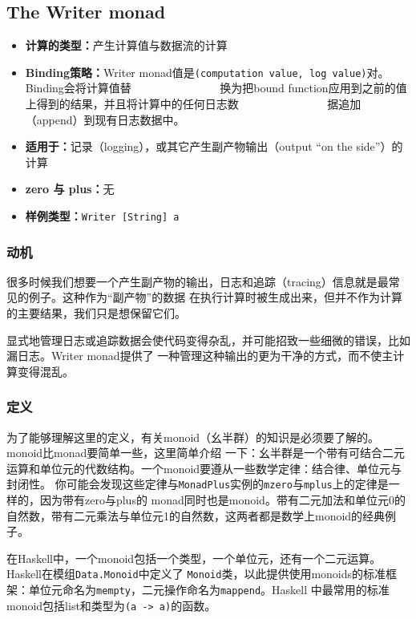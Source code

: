 \subsection{The Writer monad}
\begin{itemize}[leftmargin=*,topsep=0pt,itemsep=0pt]
\item \textbf{计算的类型：}产生计算值与数据流的计算
\item \textbf{Binding策略：}Writer monad值是\texttt{(computation value, log value)}对。Binding会将计算值替
                            $\textrm{ }\quad\quad\quad\quad\quad\;\;\quad$
                            换为把bound function应用到之前的值上得到的结果，并且将计算中的任何日志数
                            $\textrm{ }\quad\quad\quad\quad\quad\;\;\quad$
                            据追加（append）到现有日志数据中。
\item \textbf{适用于：}记录（logging），或其它产生副产物输出（output ``on the side''）的计算
\item \textbf{zero 与 plus：}无
\item \textbf{样例类型：}\texttt{Writer [String] a}
\end{itemize}

\subsubsection{动机}
\indent{}很多时候我们想要一个产生副产物的输出，日志和追踪（tracing）信息就是最常见的例子。这种作为“副产物”的数据
在执行计算时被生成出来，但并不作为计算的主要结果，我们只是想保留它们。

\indent{}显式地管理日志或追踪数据会使代码变得杂乱，并可能招致一些细微的错误，比如漏日志。Writer monad提供了
一种管理这种输出的更为干净的方式，而不使主计算变得混乱。

\subsubsection{定义}
\indent{}为了能够理解这里的定义，有关monoid（幺半群）的知识是必须要了解的。monoid比monad要简单一些，这里简单介绍
一下：幺半群是一个带有可结合二元运算和单位元的代数结构。一个monoid要遵从一些数学定律：结合律、单位元与封闭性。
你可能会发现这些定律与\texttt{MonadPlus}实例的\texttt{mzero}与\texttt{mplus}上的定律是一样的，因为带有zero与plus的
monad同时也是monoid。带有二元加法和单位元0的自然数，带有二元乘法与单位元1的自然数，这两者都是数学上monoid的经典例子。

\indent{}在Haskell中，一个monoid包括一个类型，一个单位元，还有一个二元运算。Haskell在模组\texttt{Data.Monoid}中定义了
\texttt{Monoid}类，以此提供使用monoids的标准框架：单位元命名为\texttt{mempty}，二元操作命名为\texttt{mappend}。Haskell
中最常用的标准monoid包括list和类型为\texttt{(a -> a)}的函数。

